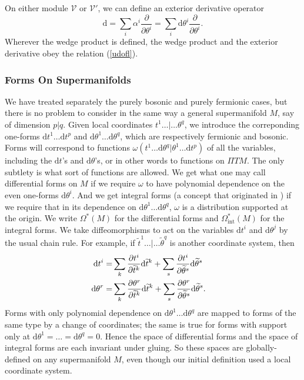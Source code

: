 \documentclass[11pt,a4paper]{article}
\def\t{{ \sf t}}
\def\tilde{\widetilde}
\def\V{{\mathcal V}}
\def\d{{\mathrm d}}
\def\t{\tilde }
\def\V{{\mathcal V}}
\def\tilde{\widetilde}
\def\Pi{\varPi}
\begin{document}
On either module $\V$ or $\V'$, we can define an exterior derivative operator
\begin{equation}\label{extder}\d=\sum_i \alpha^i\frac{\partial}{\partial\theta^i}=\sum_i\d\theta^i\frac{\partial}{\partial\theta^i}.\end{equation}
Wherever the wedge product is defined, the wedge product and the exterior derivative obey the relation (\ref{udofl}).  


\subsubsection{Forms On Supermanifolds}\label{genc}

We have treated separately the  purely bosonic and purely fermionic cases, but there is no problem to consider in the same way
a general supermanifold $M$, say of dimension $p|q$.  Given local coordinates $t^1\dots|\dots\theta^q$, we introduce
the correponding one-forms  $\d t^1\dots \d t^p$ and $\d\theta^1\dots\d\theta^q$, which are respectively fermionic and bosonic.  Forms will
correspond  to functions $\omega(t^1\dots\d\theta^q|\theta^1\dots\d t^p)$ of all the variables, including the $\d t$'s and $\d\theta$'s,  or in other words
to functions on ${\Pi} TM$.  The only subtlety is what sort of functions are allowed.  We get what one may call  differential forms on $M$ if
we require $\omega$ to have polynomial dependence on the even one-forms $\d\theta^i$.  And we get integral forms (a concept that originated in \cite{BL})  if
we require that in its dependence on $\d\theta^1\dots \d\theta^q$, $\omega$ is a distribution supported at the origin.  We write
$\Omega^*(M)$ for the differential forms and $\Omega^*_{\mathrm{int}}(M)$ for the integral forms.  
We take diffeomorphisms to act on the variables $\d t^i$ and $\d\theta^j$ by the usual chain rule.  For example, if $\t t^1\dots|\dots\t\theta^q$
is another coordinate system, then 
\begin{align}\label{onx}\d t^i =&\sum_k \frac{\partial t^i}{\partial\t t^k}\d\t t^k+\sum_s \frac{\partial t^i}{\partial \t\theta^s}\d \t\theta^s\cr
    \d \theta^r =&\sum_k \frac{\partial\theta^r}{\partial\t t^k}\d\t t^k+\sum_s \frac{\partial \theta^r}{\partial \t\theta^s}\d \t \theta^s. \end{align}
Forms with only polynomial dependence on $\d\theta^1\dots\d\theta^q$ are mapped to forms of the same type by a change of coordinates;
the same is true for forms with support    
only at $\d\theta^1=\dots=\d\theta^q=0$. Hence the space of
 differential forms and the space of integral forms are each invariant under gluing.  So 
 these spaces are globally-defined on any supermanifold $M$, even though our initial definition used a local coordinate system.
\end{document}
